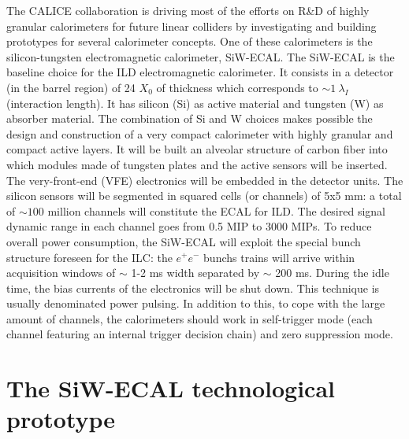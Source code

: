\documentclass[a4paper,11pt]{article}
\begin{document}
The CALICE collaboration is driving most of the efforts on R\&D of highly granular calorimeters \cite{Sefkow:2015hna} 
for future linear colliders by investigating and building prototypes for several
calorimeter concepts. One of these calorimeters 
is the silicon-tungsten electromagnetic calorimeter, SiW-ECAL.
The SiW-ECAL is the baseline choice for the ILD electromagnetic calorimeter.
It consists in a detector (in the barrel region) of 24 $X_{0}$ of thickness which corresponds to $\sim 1~\lambda_{I}$ (interaction length).
It has silicon (Si) as active material and tungsten (W) as absorber material.
The combination of Si and W choices  makes possible the design and construction
of a very compact calorimeter with highly granular and compact active layers.
It will be built an alveolar structure of carbon fiber into which modules made of tungsten
plates and the active sensors will be inserted. The very-front-end (VFE) electronics will be
embedded in the detector units. The silicon sensors will be segmented
in squared cells (or channels) of 5x5 mm: a total of $\sim 100$ million channels will constitute the ECAL for ILD.
The desired signal dynamic range in each channel goes from 0.5 MIP to 3000 MIPs.
To reduce overall power consumption, the SiW-ECAL will exploit the special bunch structure
foreseen for the ILC: the $e^{+}e^{-}$ bunchs trains will arrive within
acquisition windows of $\sim$ 1-2 ms width separated by $\sim$ 200 ms. During the idle time, the bias currents of the electronics will be shut down.
This technique is usually denominated power pulsing. In addition to this, to cope with the large amount of channels,
the calorimeters should work in self-trigger mode (each channel featuring an internal trigger decision chain) and zero suppression mode. 

\section{The SiW-ECAL technological prototype}
\end{document}
